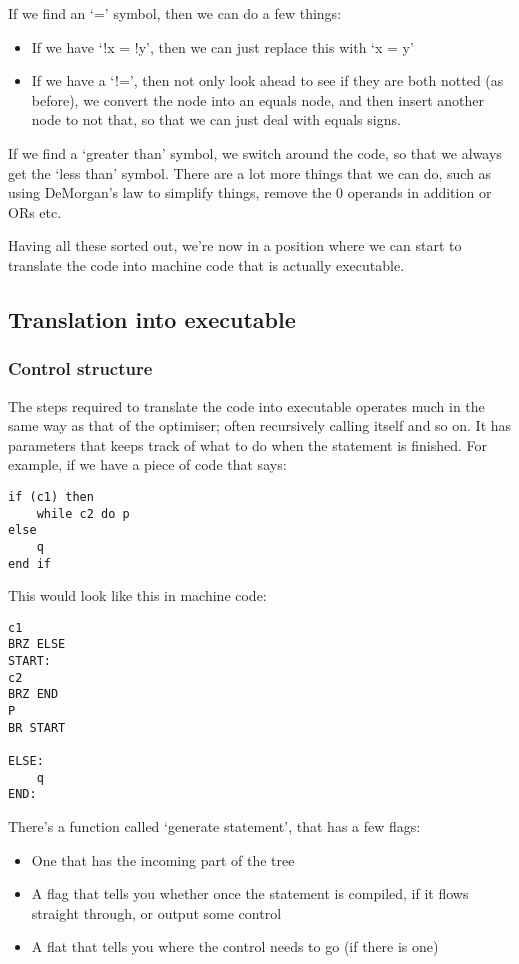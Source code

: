 \documentclass[11pt,a4paper,titlepage,dvipsnames,cmyk]{scrartcl}
\begin{document}
If we find an `=' symbol, then we can do a few things:
\begin{itemize}
    \item If we have `!x = !y', then we can just replace this with `x = y'
    \item If we have a `!=', then not only look ahead to see if they are
        both notted (as before), we convert the node into an equals node,
        and then insert another node to not that, so that we can just deal
        with equals signs.
\end{itemize}

If we find a `greater than' symbol, we switch around the code, so that we
always get the `less than' symbol. There are a lot more things that we can
do, such as using DeMorgan's law to simplify things, remove the 0 operands
in addition or ORs etc.

Having all these sorted out, we're now in a position where we can start to
translate the code into machine code that is actually executable.

\subsection{Translation into executable}%
\label{sub:executable}

\subsubsection{Control structure}%
\label{ssub:control}

The steps required to translate the code into executable operates much in
the same way as that of the optimiser; often recursively calling itself
and so on. It has parameters that keeps track of what to do when the
statement is finished. For example, if we have a piece of code that says:
\begin{lstlisting}[style=B]
if (c1) then
    while c2 do p
else
    q
end if
\end{lstlisting}

This would look like this in machine code:

\begin{lstlisting}[style=B]
c1
BRZ ELSE
START:
c2
BRZ END
P
BR START

ELSE:
    q
END:
\end{lstlisting}

There's a function called `generate statement', that has a few flags:
\begin{itemize}
    \item One that has the incoming part of the tree
    \item A flag that tells you whether once the statement is compiled, if
        it flows straight through, or output some control
    \item A flat that tells you where the control needs to go (if there is
        one)
\end{itemize}
\end{document}
